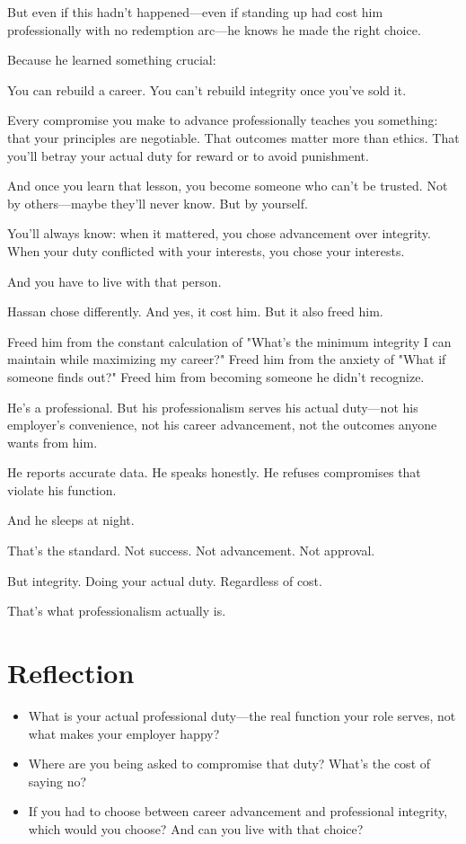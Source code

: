 \documentclass[11pt,twoside]{book}
\begin{document}
But even if this hadn't happened—even if standing up had cost him professionally with no redemption arc—he knows he made the right choice.

Because he learned something crucial:

You can rebuild a career. You can't rebuild integrity once you've sold it.

Every compromise you make to advance professionally teaches you something: that your principles are negotiable. That outcomes matter more than ethics. That you'll betray your actual duty for reward or to avoid punishment.

And once you learn that lesson, you become someone who can't be trusted. Not by others—maybe they'll never know. But by yourself.

You'll always know: when it mattered, you chose advancement over integrity. When your duty conflicted with your interests, you chose your interests.

And you have to live with that person.

Hassan chose differently. And yes, it cost him. But it also freed him.

Freed him from the constant calculation of "What's the minimum integrity I can maintain while maximizing my career?" Freed him from the anxiety of "What if someone finds out?" Freed him from becoming someone he didn't recognize.

He's a professional. But his professionalism serves his actual duty—not his employer's convenience, not his career advancement, not the outcomes anyone wants from him.

He reports accurate data. He speaks honestly. He refuses compromises that violate his function.

And he sleeps at night.

That's the standard. Not success. Not advancement. Not approval.

But integrity. Doing your actual duty. Regardless of cost.

That's what professionalism actually is.

\section*{Reflection}

\begin{itemize}
\item What is your actual professional duty—the real function your role serves, not what makes your employer happy?
\item Where are you being asked to compromise that duty? What's the cost of saying no?
\item If you had to choose between career advancement and professional integrity, which would you choose? And can you live with that choice?
\end{itemize}
\end{document}
